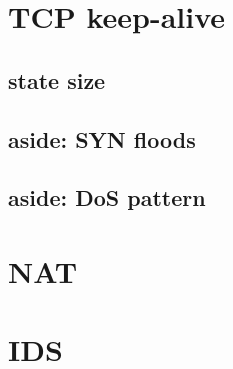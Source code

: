 

\section{TCP keep-alive}


\subsection{state size}


\subsection{aside: SYN floods}


\subsection{aside: DoS pattern}


\section{NAT}


\section{IDS}



